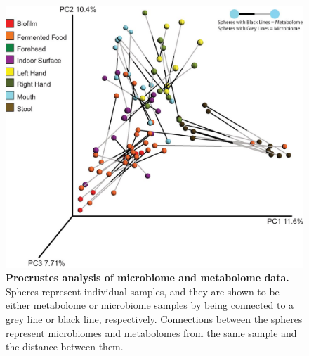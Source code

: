 \begin{figure}[htbp]
\includegraphics[width=\columnwidth]{chapter_48_hours_figures/F5.jpg}
\caption[Procrustes analysis of microbiome and metabolome data]{\textbf{Procrustes analysis of microbiome and metabolome data.} Spheres represent individual samples, and they are shown to be either metabolome or microbiome samples by being connected to a grey line or black line, respectively. Connections between the spheres represent microbiomes and metabolomes from the same sample and the distance between them.}
\label{rrfigure5}
\end{figure}

